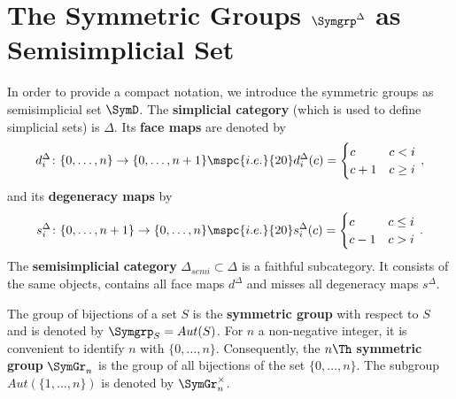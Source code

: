 \section{The Symmetric Groups \texorpdfstring{$\Symgrp^\Delta$}{SDelta} as Semisimplicial Set}
\label{notation:semi_simpl_sym_grp}
In order to provide a compact notation, we introduce the symmetric groups as semisimplicial set $\SymD$.
\label{page:simplicial_category}%
The {\bfseries simplicial category} (which is used to define simplicial sets) is $\Delta$.
\label{page:simplicial_face}%
Its {\bfseries face maps} are denoted by
\[
    d^\Delta_i \colon \{0, \ldots, n\} \to \{0, \ldots, n+1\} \mspc{i.e.}{20} d^\Delta_i(c) = \begin{cases} c & c < i \\ c+1 & c \ge i \end{cases}\,,
\]
\label{page:simplicial_degeneracy}%
and its {\bfseries degeneracy maps} by
\[
    s^\Delta_i \colon \{0, \ldots, n+1\} \to \{0, \ldots, n\} \mspc{i.e.}{20} s^\Delta_i(c) = \begin{cases} c & c \le i \\ c-1 & c > i \end{cases} \,.
\]
\label{page:semisimplicial_category}%
The {\bfseries semisimplicial category} $\Delta_{semi} \subset \Delta$ is a faithful subcategory.
It consists of the same objects, contains all face maps $d^\Delta$ and misses all degeneracy maps $s^\Delta$.

\begin{defi}
    \label{notation:sym_grp}
    The group of bijections of a set $S$ is the {\bfseries symmetric group} with respect to $S$ and is denoted by $\Symgrp_{S} = Aut(S)$.
    For $n$ a non-negative integer, it is convenient to identify $n$ with $\{0, \ldots, n\}$.
    Consequently, the $n\Th$ {\bfseries symmetric group} $\SymGr_n$ is the group of all bijections of the set $\{ 0, \ldots, n\}$.
    The subgroup $Aut(\{ 1, \ldots, n\})$ is denoted by $\SymGr_n^\times$.
\end{defi}

